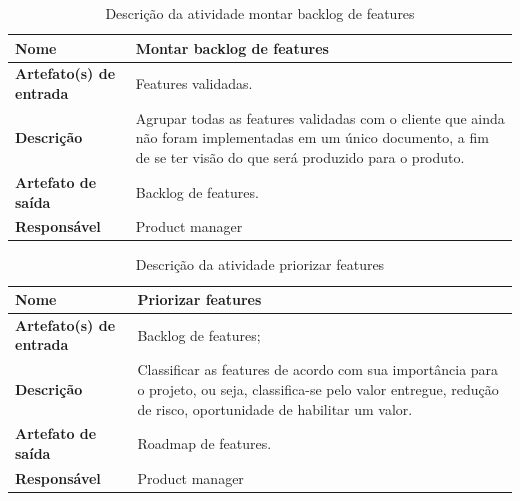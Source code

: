     \begin{table}[H]
        \centering
        \label{descricaoAtividades11}
        \caption{Descrição da atividade montar backlog de features}
            \begin{tabular}{|l|p{10cm}|}
            \hline
            \textbf{Nome} & Montar backlog de features \\
            \hline
            \textbf{Artefato(s) de entrada} & Features validadas. \\
            \hline
            \textbf{Descrição} & Agrupar todas as features validadas com o cliente que ainda não foram implementadas em um único documento, a fim de se ter visão do que será produzido para o produto. \\
            \hline
            \textbf{Artefato de saída} & Backlog de features. \\
            \hline
            \textbf{Responsável} & Product manager \\
            \hline
        \end{tabular}
    \end{table}

    \begin{table}[H]
        \centering
        \label{descricaoAtividades12}
        \caption{Descrição da atividade priorizar features}
            \begin{tabular}{|l|p{10cm}|}
            \hline
            \textbf{Nome} & Priorizar features \\
            \hline
            \textbf{Artefato(s) de entrada} & Backlog de features; \\
            \hline
            \textbf{Descrição} & Classificar as features de acordo com sua importância para o projeto, ou seja, classifica-se pelo valor entregue, redução de risco, oportunidade de habilitar um valor. \\
            \hline
            \textbf{Artefato de saída} & Roadmap de features. \\
            \hline
            \textbf{Responsável} & Product manager \\
            \hline
        \end{tabular}
    \end{table}


